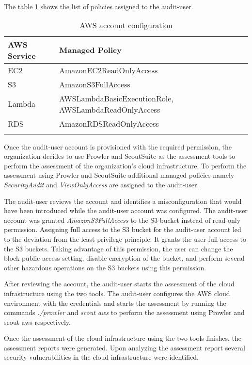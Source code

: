 The table \ref{tab:accountconfiguration} shows the list
of policies assigned to the audit-user.
\\
\begin{longtable}{|p{6cm}|p{8cm}|}
    \hline
    \textbf{AWS Service} & \textbf{Managed Policy}\\
    \hline
    EC2 & AmazonEC2ReadOnlyAccess \\
    \hline
    S3 & AmazonS3FullAccess \\
    \hline
    Lambda & AWSLambdaBasicExecutionRole,
    AWSLambdaReadOnlyAccess \\
    \hline
    RDS & AmazonRDSReadOnlyAccess \\
    \hline
    \caption{AWS account configuration}
    \label{tab:accountconfiguration}
\end{longtable}



\par Once the audit-user account is provisioned with the
required permission, the organization decides to
use Prowler and ScoutSuite as the assessment tools to perform the assessment of the organization’s cloud infrastructure.
To perform the assessment using Prowler and ScoutSuite additional managed policies namely \textit{SecurityAudit} and \textit{ViewOnlyAccess} are assigned to the audit-user.

\par The audit-user reviews the account and identifies a misconfiguration that would have been introduced while the audit-user account was configured.
The audit-user account was granted \textit{AmazonS3FullAccess} to the S3 bucket instead of read-only permission.
Assigning full access to the S3 bucket for the audit-user account led to the deviation from the least privilege principle.
It grants the user full access to the S3 buckets.
Taking advantage of this permission, the user can change the block public access setting, disable encryption of the bucket, and perform several other hazardous operations on the S3 buckets using this permission.

\par After reviewing the account, the audit-user starts the assessment of the cloud infrastructure using the two tools.
The audit-user configures the AWS cloud environment with the credentials and starts the assessment by running the commands \textit{./prowler} and \textit{scout aws} to perform the assessment using Prowler and scout aws respectively.

\par Once the assessment of the cloud infrastructure using
the two tools finishes, the assessment reports were generated.
Upon analyzing the assessment report several security vulnerabilities in the cloud infrastructure were identified.

